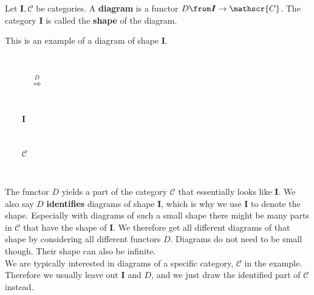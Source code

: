 \begin{definition}
  Let $\bm{I}, \mathscr{C}$ be categories.
  A \textbf{diagram} is a functor $D \from \bm{I} \to \mathscr{C}$.
  The category $\bm{I}$ is called the \textbf{shape} of the diagram.
\end{definition}
\begin{example}
  \label{diagramexample}
  This is an example of a diagram of shape $\bm I$. \\[1cm]
  \begin{minipage}{0.3\linewidth}
    \hspace{2cm}
    \\
  \end{minipage}%
  \begin{minipage}{0.2\linewidth}
    $\qquad\quad\overset{D}{\Longrightarrow}$
  \end{minipage}%
  \begin{minipage}{0.1\linewidth}
  \end{minipage}\\[2em]
  \begin{minipage}{0.3\linewidth}
    \hspace{2cm}
    $\qquad \bm I$
  \end{minipage}%
  \begin{minipage}{0.2\linewidth}
    \
  \end{minipage}%
  \begin{minipage}{0.3\linewidth}
    \hspace{2cm}
    $\qquad \mathscr C$
  \end{minipage}\\[1em]
\end{example}

The functor $D$ yields
a part of the category $\mathscr C$ that essentially looks like $\bm I$.
We also say $D$ \textbf{identifies} diagrams of shape $\bm I$,
which is why we use $\bm I$ to denote the shape.
Especially with diagrams of such a small shape
there might be many parts in $\mathscr C$ that have the shape of $\bm I$.
We therefore get all different diagrams of that shape by considering
all different functors $D$.
Diagrams do not need to be small though. Their shape can also be infinite.\\
We are typically interested in diagrams of a specific category,
$\mathscr C$ in the example. Therefore we usually leave out $\bm I$ and $D$,
and we just draw the identified part of $\mathscr C$ instead.

